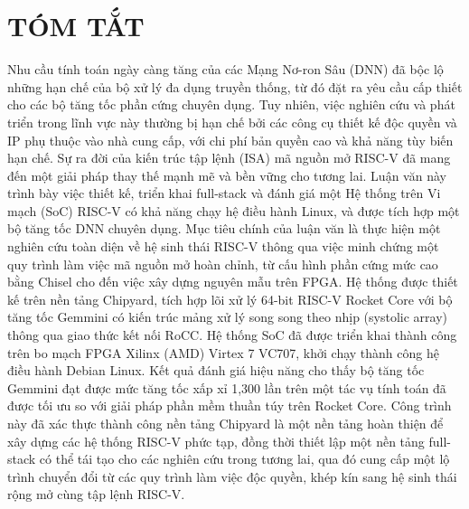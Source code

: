 \chapter*{TÓM TẮT}
\label{Abstract}

Nhu cầu tính toán ngày càng tăng của các Mạng Nơ-ron Sâu (DNN) đã bộc lộ những hạn chế của bộ xử lý đa dụng truyền thống, từ đó đặt ra yêu cầu cấp thiết cho các bộ tăng tốc phần cứng chuyên dụng. Tuy nhiên, việc nghiên cứu và phát triển trong lĩnh vực này thường bị hạn chế bởi các công cụ thiết kế độc quyền và IP phụ thuộc vào nhà cung cấp, với chi phí bản quyền cao và khả năng tùy biến hạn chế. Sự ra đời của kiến trúc tập lệnh (ISA) mã nguồn mở RISC-V đã mang đến một giải pháp thay thế mạnh mẽ và bền vững cho tương lai. Luận văn này trình bày việc thiết kế, triển khai full-stack và đánh giá một Hệ thống trên Vi mạch (SoC) RISC-V có khả năng chạy hệ điều hành Linux, và được tích hợp một bộ tăng tốc DNN chuyên dụng. Mục tiêu chính của luận văn là thực hiện một nghiên cứu toàn diện về hệ sinh thái RISC-V thông qua việc minh chứng một quy trình làm việc mã nguồn mở hoàn chỉnh, từ cấu hình phần cứng mức cao bằng Chisel cho đến việc xây dựng nguyên mẫu trên FPGA. Hệ thống được thiết kế trên nền tảng Chipyard, tích hợp lõi xử lý 64-bit RISC-V Rocket Core với bộ tăng tốc Gemmini có kiến trúc mảng xử lý song song theo nhịp (systolic array) thông qua giao thức kết nối RoCC. Hệ thống SoC đã được triển khai thành công trên bo mạch FPGA Xilinx (AMD) Virtex 7 VC707, khởi chạy thành công hệ điều hành Debian Linux. Kết quả đánh giá hiệu năng cho thấy bộ tăng tốc Gemmini đạt được mức tăng tốc xấp xỉ 1,300 lần trên một tác vụ tính toán đã được tối ưu so với giải pháp phần mềm thuần túy trên Rocket Core. Công trình này đã xác thực thành công nền tảng Chipyard là một nền tảng hoàn thiện để xây dựng các hệ thống RISC-V phức tạp, đồng thời thiết lập một nền tảng full-stack có thể tái tạo cho các nghiên cứu trong tương lai, qua đó cung cấp một lộ trình chuyển đổi từ các quy trình làm việc độc quyền, khép kín sang hệ sinh thái rộng mở cùng tập lệnh RISC-V.

